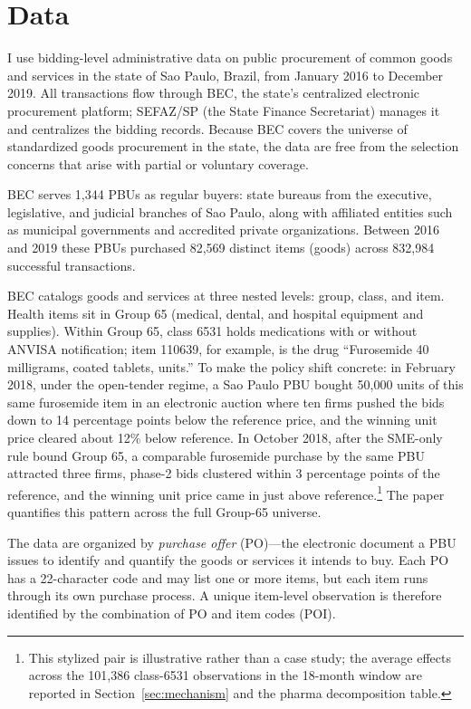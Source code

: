 \section{Data}

I use bidding-level administrative data on public procurement of common goods and services in the state of Sao Paulo, Brazil, from January 2016 to December 2019. All transactions flow through BEC, the state's centralized electronic procurement platform; SEFAZ/SP (the State Finance Secretariat) manages it and centralizes the bidding records. Because BEC covers the universe of standardized goods procurement in the state, the data are free from the selection concerns that arise with partial or voluntary coverage.

BEC serves 1{,}344 PBUs as regular buyers: state bureaus from the executive, legislative, and judicial branches of Sao Paulo, along with affiliated entities such as municipal governments and accredited private organizations. Between 2016 and 2019 these PBUs purchased 82{,}569 distinct items (goods) across 832{,}984 successful transactions.

BEC catalogs goods and services at three nested levels: group, class, and item. Health items sit in Group 65 (medical, dental, and hospital equipment and supplies). Within Group 65, class 6531 holds medications with or without ANVISA notification; item 110639, for example, is the drug ``Furosemide 40 milligrams, coated tablets, units.'' To make the policy shift concrete: in February 2018, under the open-tender regime, a Sao Paulo PBU bought 50{,}000 units of this same furosemide item in an electronic auction where ten firms pushed the bids down to 14 percentage points below the reference price, and the winning unit price cleared about 12\% below reference. In October 2018, after the SME-only rule bound Group 65, a comparable furosemide purchase by the same PBU attracted three firms, phase-2 bids clustered within 3 percentage points of the reference, and the winning unit price came in just above reference.\footnote{This stylized pair is illustrative rather than a case study; the average effects across the 101{,}386 class-6531 observations in the 18-month window are reported in Section~\ref{sec:mechanism} and the pharma decomposition table.} The paper quantifies this pattern across the full Group-65 universe.

The data are organized by \emph{purchase offer} (PO)---the electronic document a PBU issues to identify and quantify the goods or services it intends to buy. Each PO has a 22-character code and may list one or more items, but each item runs through its own purchase process. A unique item-level observation is therefore identified by the combination of PO and item codes (POI).


